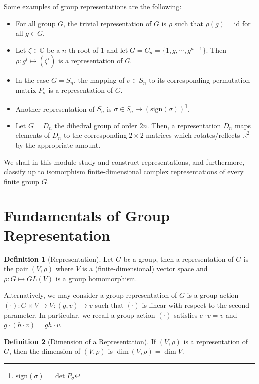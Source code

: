 \documentclass[]{article}
\theoremstyle{definition}
\theoremstyle{definition}
\newtheorem{definition}{Definition}[section]
\begin{document}
Some examples of group representations are the following:
\begin{itemize}
  \item For all group \(G\), the trivial representation of \(G\) is \(\rho\) such 
    that \(\rho(g) = \text{id}\) for all \(g \in G\).
  \item Let \(\zeta \in \mathbb{C}\) be a \(n\)-th root of \(1\) and let 
    \(G = C_n = \{1, g, \cdots, g^{n - 1}\}\). Then \(\rho : g^i \mapsto (\zeta^i)\)
    is a representation of \(G\).
  \item In the case \(G = S_n\), the mapping of \(\sigma \in S_n\) to its 
    corresponding permutation matrix \(P_\sigma\) is a representation of \(G\).
  \item Another representation of \(S_n\) is 
    \(\sigma \in S_n \mapsto (\text{sign}(\sigma))\)\footnote{\(\text{sign}(\sigma) = \det P_\sigma\)}.
  \item Let \(G = D_n\) the dihedral group of order \(2n\). Then, a representation 
    \(D_n\) maps elements of \(D_n\) to the corresponding \(2 \times 2\) matrices 
    which rotates/reflects \(\mathbb{R}^2\) by the appropriate amount.
\end{itemize}

We shall in this module study and construct representations, and furthermore, 
classify up to isomorphism finite-dimensional complex representations of 
every finite group \(G\). 

\section{Fundamentals of Group Representation}

\begin{definition}[Representation]
  Let \(G\) be a group, then a representation of \(G\) is the pair \((V, \rho)\) 
  where \(V\) is a (finite-dimensional) vector space and \(\rho : G \mapsto GL(V)\) 
  is a group homomorphism.
\end{definition}

Alternatively, we may consider a group representation of \(G\) is a group action 
\((\cdot) : G \times V \to V : (g, v) \mapsto v\) such that \((\cdot)\) is 
linear with respect to the second parameter. In particular, we recall a group 
action \((\cdot)\) satisfies \(e \cdot v = v\) and 
\(g \cdot (h \cdot v) = gh \cdot v\). 

\begin{definition}[Dimension of a Representation]
  If \((V, \rho)\) is a representation of \(G\), then the dimension of 
  \((V, \rho)\) is \(\dim(V, \rho) = \dim V\).
\end{definition}
\end{document}
